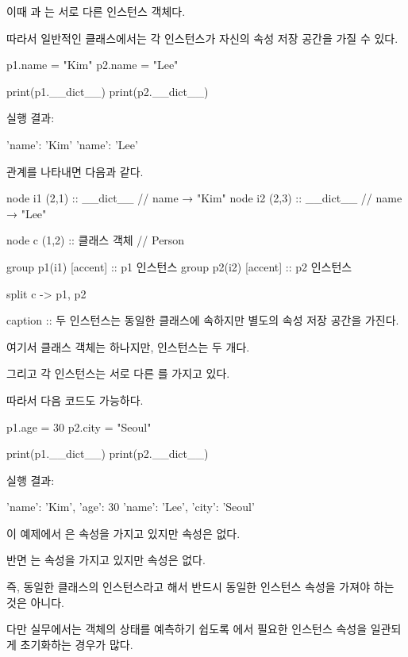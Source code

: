 이때 과 는 서로 다른 인스턴스 객체다.

따라서 일반적인 클래스에서는 각 인스턴스가 자신의 속성 저장 공간을 가질 수 있다.

\begin{dhkcode}
p1.name = "Kim"
p2.name = "Lee"

print(p1.__dict__)
print(p2.__dict__)
\end{dhkcode}

실행 결과:

\begin{dhkzsh}
{'name': 'Kim'}
{'name': 'Lee'}
\end{dhkzsh}

관계를 나타내면 다음과 같다.

\begin{dhkgraph}
node i1 (2,1) :: __dict__ // name → "Kim"
node i2 (2,3) :: __dict__ // name → "Lee"

node c (1,2) :: 클래스 객체 // Person

group p1(i1) [accent] :: p1 인스턴스
group p2(i2) [accent] :: p2 인스턴스

split c -> p1, p2

caption :: 두 인스턴스는 동일한 클래스에 속하지만 별도의 속성 저장 공간을 가진다.
\end{dhkgraph}

여기서 클래스 객체는 하나지만, 인스턴스는 두 개다.

그리고 각 인스턴스는 서로 다른 를 가지고 있다.

따라서 다음 코드도 가능하다.

\begin{dhkcode}
p1.age = 30
p2.city = "Seoul"

print(p1.__dict__)
print(p2.__dict__)
\end{dhkcode}

실행 결과:

\begin{dhkzsh}
{'name': 'Kim', 'age': 30}
{'name': 'Lee', 'city': 'Seoul'}
\end{dhkzsh}

이 예제에서 은  속성을 가지고 있지만  속성은 없다.

반면 는  속성을 가지고 있지만  속성은 없다.

즉, 동일한 클래스의 인스턴스라고 해서 반드시 동일한 인스턴스 속성을 가져야 하는 것은 아니다.

다만 실무에서는 객체의 상태를 예측하기 쉽도록 에서 필요한 인스턴스 속성을 일관되게 초기화하는 경우가 많다.

